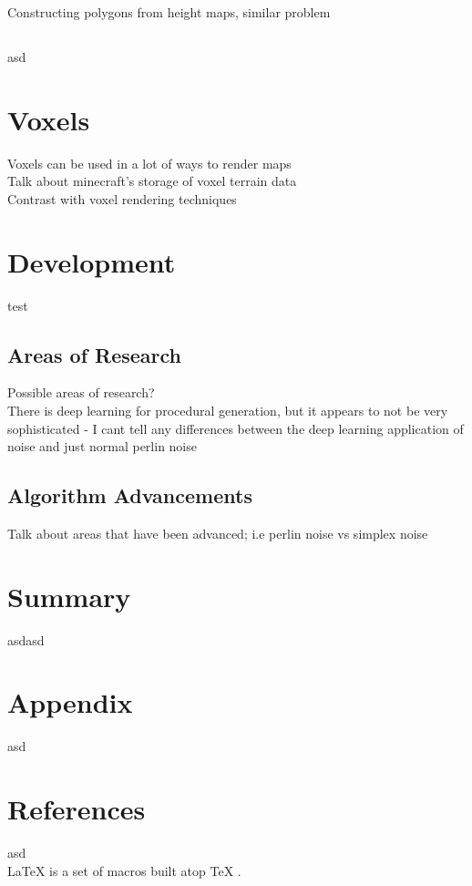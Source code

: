 \documentclass[12pt]{report}
\begin{document}
		Constructing polygons from height maps, similar problem\\
		
		
		\section{}
		asd \\ 
	
	\chapter{Voxels}
	
		\noindent Voxels can be used in a lot of ways to render maps \\
		Talk about minecraft's storage of voxel terrain data \\
		Contrast with voxel rendering techniques\\
		
	\let\clearpage\relax
	\chapter{Development}
		\noindent test\\
		
		\section{Areas of Research}
		
		Possible areas of research? \\
		There is deep learning for procedural generation, but it appears to not be very sophisticated - I cant tell any differences between the deep learning application of noise and just normal perlin noise\\
		
		\section{Algorithm Advancements}
		
		Talk about areas that have been advanced; i.e perlin noise vs simplex noise \\
		
	\let\clearpage\relax
	\chapter{Summary}
		asdasd \\
		
	\let\clearpage\relax
	\chapter{Appendix}
		asd \\
		
	\let\clearpage\relax
	\chapter{References}
		asd \\
	
	\LaTeX{} \cite{7522149} is a set of macros built atop \TeX{} \cite{7522149}.
		
		
	

	
\end{document}
